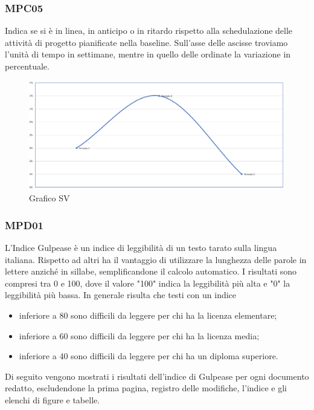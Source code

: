 \subsubsection{MPC05}
Indica se si è in linea, in anticipo o in ritardo rispetto alla schedulazione delle attività di progetto pianificate nella baseline.
Sull'asse delle ascisse troviamo l'unità di tempo in settimane, mentre in quello delle ordinate la variazione in percentuale.
\begin{figure}[H]
\centering
\includegraphics[width=1\textwidth]{src/img/grafico_SV.png}
\caption{Grafico SV}
\end{figure}

\subsubsection{MPD01}
L'Indice Gulpease è un indice di leggibilità di un testo tarato sulla lingua italiana. Rispetto ad altri ha il vantaggio di utilizzare la lunghezza delle parole in lettere anziché in sillabe, semplificandone il calcolo automatico.
I risultati sono compresi tra 0 e 100, dove il valore "100" indica la leggibilità più alta e "0" la leggibilità più bassa. In generale risulta che testi con un indice
\begin{itemize}
    \item inferiore a 80 sono difficili da leggere per chi ha la licenza elementare;
    \item inferiore a 60 sono difficili da leggere per chi ha la licenza media;
    \item inferiore a 40 sono difficili da leggere per chi ha un diploma superiore.
\end{itemize}

Di seguito vengono mostrati i risultati dell’indice di Gulpease per ogni documento redatto, escludendone la prima pagina, registro delle modifiche, l'indice e gli elenchi di figure e tabelle.

